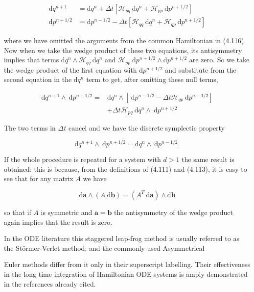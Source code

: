 \documentclass[10pt]{article}
\begin{document}
\[
\begin{aligned}
\mathrm{d} q^{n+1} & =\mathrm{d} q^{n}+\Delta t\left[\mathcal{H}_{p q} \mathrm{~d} q^{n}+\mathcal{H}_{p p} \mathrm{~d} p^{n+1 / 2}\right] \\
\mathrm{d} p^{n+1 / 2} & =\mathrm{d} p^{n-1 / 2}-\Delta t\left[\mathcal{H}_{q q} \mathrm{~d} q^{n}+\mathcal{H}_{q p} \mathrm{~d} p^{n+1 / 2}\right]
\end{aligned}
\]

where we have omitted the arguments from the common Hamiltonian in (4.116). Now when we take the wedge product of these two equations, its antisymmetry implies that terms \(\mathrm{d} q^{n} \wedge \mathcal{H}_{q q} \mathrm{~d} q^{n}\) and \(\mathcal{H}_{p p} \mathrm{~d} p^{n+1 / 2} \wedge \mathrm{d} p^{n+1 / 2}\) are zero. So we take the wedge product of the first equation with \(\mathrm{d} p^{n+1 / 2}\) and substitute from the second equation in the \(\mathrm{d} q^{n}\) term to get, after omitting these null terms,

\[
\begin{aligned}
\mathrm{d} q^{n+1} \wedge \mathrm{~d} p^{n+1 / 2}= & \mathrm{d} q^{n} \wedge\left[\mathrm{~d} p^{n-1 / 2}-\Delta t \mathcal{H}_{q p} \mathrm{~d} p^{n+1 / 2}\right] \\
& +\Delta t \mathcal{H}_{p q} \mathrm{~d} q^{n} \wedge \mathrm{~d} p^{n+1 / 2}
\end{aligned}
\]

The two terms in \(\Delta t\) cancel and we have the discrete symplectic property

\[
\mathrm{d} q^{n+1} \wedge \mathrm{~d} p^{n+1 / 2}=\mathrm{d} q^{n} \wedge \mathrm{~d} p^{n-1 / 2} .
\]

If the whole procedure is repeated for a system with \(d>1\) the same result is obtained: this is because, from the definitions of (4.111) and (4.113), it is easy to see that for any matrix \(A\) we have

\[
\mathrm{d} \mathbf{a} \wedge(A \mathrm{~d} \mathbf{b})=\left(A^{T} \mathrm{~d} \mathbf{a}\right) \wedge \mathrm{d} \mathbf{b}
\]

so that if \(A\) is symmetric and \(\mathbf{a}=\mathbf{b}\) the antisymmetry of the wedge product again implies that the result is zero.

In the ODE literature this staggered leap-frog method is usually referred to as the Störmer-Verlet method; and the commonly used Asymmetrical

Euler methods differ from it only in their superscript labelling. Their effectiveness in the long time integration of Hamiltonian ODE systems is amply demonstrated in the references already cited.
\end{document}
